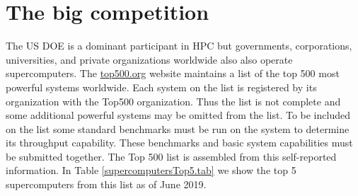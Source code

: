 \section{The big competition} 

The US DOE is a dominant participant in HPC but governments, corporations, universities, and private organizations worldwide also also operate supercomputers. The \href{http://top500.org}{top500.org} website maintains a list of the top 500 most powerful systems worldwide. Each system on the list is registered by its organization with the Top500 organization. Thus the list is not complete and some additional powerful systems may be omitted from the list. To be included on the list some standard benchmarks must be run on the system to determine its throughput capability. These benchmarks and basic system capabilities must be submitted together. The Top 500 list is assembled from this self-reported information. In Table \ref{supercomputersTop5.tab} we show the top 5 supercomputers from this list as of June 2019. 

